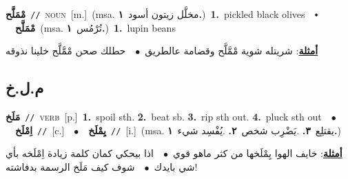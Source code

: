\documentclass[10pt,a4paper,twoside]{article} %
\begin{document}
\begin{multicols}{2}
{\setlength\topsep{0pt}\textbf{\foreignlanguage{arabic}{مْمَلَّح}}\ {\color{gray}\texttt{//}\color{black}}\ \textsc{noun}\ [m.]\ \color{gray}(msa. \foreignlanguage{arabic}{مخلَّل زيتون أسود}~\foreignlanguage{arabic}{\textbf{١.}})\color{black}\ \textbf{1.}~pickled black olives\ \ $\smblkdiamond$\ \ \setlength\topsep{0pt}\textbf{\foreignlanguage{arabic}{مْمَلَّح}}\ \color{gray}(msa. \foreignlanguage{arabic}{تُرْمُس}~\foreignlanguage{arabic}{\textbf{١.}})\color{black}\ \textbf{1.}~lupin beans\  \begin{flushright}\color{gray}\foreignlanguage{arabic}{\textbf{\underline{\foreignlanguage{arabic}{أمثلة}}}: شريتله شوية مْمَّلَّح وقضامة عالطريق\ $\bullet$\ \  حطلك صحن مْمَّلَّح خلينا نذوقه}\end{flushright}\color{black}} \vspace{2mm}

\vspace{-3mm}
\subsection*{\color{blue}\foreignlanguage{arabic}{م.ل.خ}\color{blue}{}} 

{\setlength\topsep{0pt}\textbf{\foreignlanguage{arabic}{مَلَخ}}\ {\color{gray}\texttt{//}\color{black}}\ \textsc{verb}\ [p.]\ \textbf{1.}~spoil sth.  \textbf{2.}~beat sb.  \textbf{3.}~rip sth out.  \textbf{4.}~pluck sth out\ \ $\bullet$\ \ \setlength\topsep{0pt}\textbf{\foreignlanguage{arabic}{اِمْلَخ}}\ {\color{gray}\texttt{//}\color{black}}\ [c.]\ \ $\bullet$\ \ \setlength\topsep{0pt}\textbf{\foreignlanguage{arabic}{يِمْلَخ}}\ {\color{gray}\texttt{//}\color{black}}\ [i.]\ \color{gray}(msa. \foreignlanguage{arabic}{يقتلِع}~\foreignlanguage{arabic}{\textbf{٣.}}  .\foreignlanguage{arabic}{يَضْرِب شخص}~\foreignlanguage{arabic}{\textbf{٢.}}  .\foreignlanguage{arabic}{يُفْسِد شيء}~\foreignlanguage{arabic}{\textbf{١.}})\color{black}\  \begin{flushright}\color{gray}\foreignlanguage{arabic}{\textbf{\underline{\foreignlanguage{arabic}{أمثلة}}}: خايف الهوا يِمْلَخها من كثر ماهو قوي\ $\bullet$\ \  اذا بيحكي كمان كلمة زيادة اِمْلَخه بأي شي بايدك\ $\bullet$\ \  شوف كيف مَلَخ الرسمة بدفاشته!}\end{flushright}\color{black}} \vspace{2mm}


\end{multicols}
\end{document}

